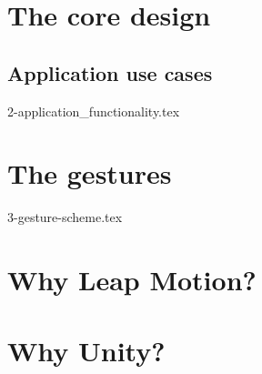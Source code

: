 \section{The core design} 
% 


\subsection{Application use cases}
{2-application_functionality.tex}

\section{The gestures}
\label{sec:gesture_design}
{3-gesture-scheme.tex}

\section{Why Leap Motion?}

\section{Why Unity?}


